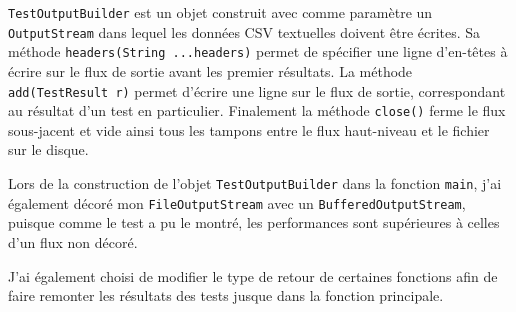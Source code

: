 \documentclass[a4paper,11pt]{article}
\begin{document}
\texttt{TestOutputBuilder} est un objet construit avec comme paramètre un \texttt{OutputStream} dans lequel les données CSV textuelles doivent être écrites. Sa méthode \texttt{headers(String ...headers)} permet de spécifier une ligne d'en-têtes à écrire sur le flux de sortie avant les premier résultats. La méthode \texttt{add(TestResult r)} permet d'écrire une ligne sur le flux de sortie, correspondant au résultat d'un test en particulier. Finalement la méthode \texttt{close()} ferme le flux sous-jacent et vide ainsi tous les tampons entre le flux haut-niveau et le fichier sur le disque.

Lors de la construction de l'objet \texttt{TestOutputBuilder} dans la fonction \texttt{main}, j'ai également décoré mon \texttt{FileOutputStream} avec un \texttt{BufferedOutputStream}, puisque comme le test a pu le montré, les performances sont supérieures à celles d'un flux non décoré.

J'ai également choisi de modifier le type de retour de certaines fonctions afin de faire remonter les résultats des tests jusque dans la fonction principale.
\end{document}

